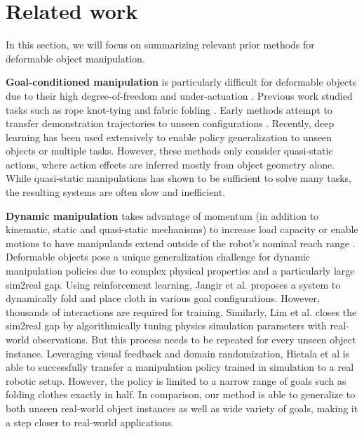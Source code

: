 \section{Related work}
In this section, we will focus on summarizing relevant prior methods for deformable object manipulation. 

\textbf{Goal-conditioned manipulation} 
is particularly difficult for deformable objects due to their high degree-of-freedom and under-actuation \cite{7989247, 8575448,goal_transporter,ken_dense_descriptor,fabric_vsf_2020,abbeel_early}. Previous work studied tasks such as rope knot-tying \cite{ken_dense_descriptor} and fabric folding \cite{fabric_vsf_2020}. Early methods attempt to transfer demonstration trajectories to unseen configurations \cite{abbeel_early}. Recently, deep learning has been used extensively \cite{goal_transporter,ken_dense_descriptor,fabric_vsf_2020} to enable policy generalization to unseen objects or multiple tasks. However, these methods only consider quasi-static actions, where action effects are inferred mostly from object geometry alone. 
While quasi-static manipulations has shown to be sufficient to solve many tasks, the resulting systems are often slow and inefficient.

\textbf{Dynamic manipulation}
takes advantage of momentum (in addition to kinematic, static and quasi-static mechanisms) to increase load capacity or enable motions to have manipulands extend outside of the robot's nominal reach range \cite{dynamic_og,tossingbot,8344486,7139990,8280543,fast_hand,japan_shake}. Deformable objects pose a unique generalization challenge for dynamic manipulation policies due to complex physical properties and a particularly large sim2real gap.
%
Using reinforcement learning, Jangir et al. \cite{dyn_cloth_rl} proposes a system to dynamically fold and place cloth in various goal configurations. However, thousands of interactions are required for training. Similarly, Lim et al.\cite{casting} closes the sim2real gap by algorithmically tuning physics simulation parameters with real-world observations. But this process needs to be repeated for every unseen object instance. 
%
Leveraging visual feedback and domain randomization, Hietala et al \cite{finnish} is able to successfully transfer a manipulation policy trained in simulation to a real robotic setup. However, the policy is limited to a narrow range of goals such as folding clothes exactly in half. In comparison, our method is able to generalize to both unseen real-world object instances as well as wide variety of goals, making it a step closer to real-world applications.

